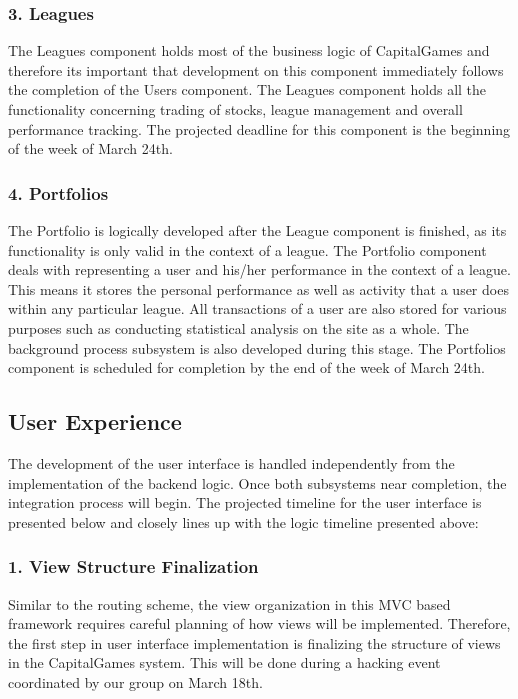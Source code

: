 \subsubsection{3. Leagues}
The Leagues component holds most of the business logic of CapitalGames and therefore its important that development on this component immediately follows the completion of the Users component. The Leagues component holds all the functionality concerning trading of stocks, league management and overall performance tracking. The projected deadline for this component is the beginning of the week of March 24th. \\ 
\subsubsection{4. Portfolios}
The Portfolio is logically developed after the League component is finished, as its functionality is only valid in the context of a league. The Portfolio component deals with representing a user and his/her performance in the context of a league. This means it stores the personal performance as well as activity that a user does within any particular league. All transactions of a user are also stored for various purposes such as conducting statistical analysis on the site as a whole. The background process subsystem is also developed during this stage. The Portfolios component is scheduled for completion by the end of the week of March 24th. \\

\subsection{User Experience}
The development of the user interface is handled independently from the implementation of the backend logic. Once both subsystems near completion, the integration process will begin. The projected timeline for the user interface is presented below and closely lines up with the logic timeline presented above: \\
\subsubsection{1. View Structure Finalization}
Similar to the routing scheme, the view organization in this MVC based framework requires careful planning of how views will be implemented. Therefore, the first step in user interface implementation is finalizing the structure of views in the CapitalGames system. This will be done during a hacking event coordinated by our group on March 18th. \\

